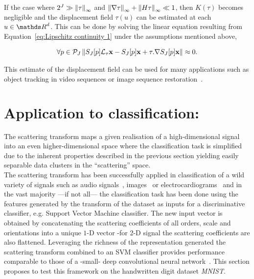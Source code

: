 \documentclass[a4paper,11pt]{report}
\begin{document}
			\begin{rem}
				If the case where $2^{J} \gg \left\lVert \tau \right\rVert_{\infty}$ and $\left\lVert \nabla \tau \right\rVert_{\infty} + \left\lVert H \tau \right\rVert_{\infty} \ll 1$, then $K(\tau)$ becomes negligible and the displacement field $\tau(u)$ can be estimated at each $u \in \dsR^{d}$. This can be done by solving the linear equation resulting from Equation~\ref{eq:Lipschitz continuity 1} under the assumptions mentioned above,
				
				\begin{equation}
					\forall p \in \mathcal{P}_{J} \left\lVert S_{J}[p]\mathcal{L}_{\tau}{\bf x} - S_{J}[p]{\bf x} + \tau . \nabla S_{J}[p]{\bf x} \right\rVert \approx 0.
					\label{eq:Lipschitz continuity 2}  
				\end{equation}
				
				This estimate of the displacement field can be used for many applications such as object tracking in video sequences or image sequence restoration~\citep{brailean1996recursive}.
			\end{rem}
			
		
  \section{Application to classification:}
    \label{sec:ST/Applications to clf}
   
    The scattering transform maps a given realisation of a high-dimensional signal into an even higher-dimensional space where the classification task is simplified due to the inherent properties described in the previous section yielding easily separable data clusters in the ``scattering'' space.\\
    
    The scattering transform has been successfully applied in classification of a wild variety of signals such as audio signals~\citep{anden2011multiscale}, images~\citep{oyallon2014deep} or electrocardiograms~\citep{chudacek2014low} and in the vast majority ---if not all--- the classification task has been done using the features generated by the transform of the dataset as inputs for a discriminative classifier, e.g. Support Vector Machine classifier. The new input vector is obtained by concatenating the scattering coefficients of all orders, scale and orientations into a unique $1$-D vector -for 2-D signal the scattering coefficients are also flattened. Leveraging the richness of the representation generated the scattering transform combined to an SVM classifier provides performance comparable to those of a -small- deep convolutional neural network~\citep{oyallon2013generic}. This section proposes to test this framework on the handwritten digit dataset \textit{MNIST}.\\
    
\end{document}
